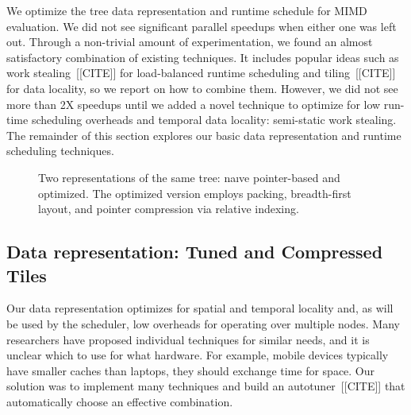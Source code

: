 We optimize the tree data representation and runtime schedule for MIMD evaluation. We did not see significant parallel speedups when either one was left out. Through a non-trivial amount of experimentation, we found an almost satisfactory combination of existing techniques. It includes popular ideas such as work stealing~[[CITE]] for load-balanced runtime scheduling and tiling~[[CITE]] for data locality, so we report on how to combine them. However, we did not see more than 2X speedups until we added a novel technique to optimize for low  run-time scheduling overheads and temporal data locality: semi-static work stealing. The remainder of this section explores our basic data representation and runtime scheduling techniques.


\begin{figure}
\centering
{} \linebreak
{}
\caption{Two representations of the same tree: na\i{v}e pointer-based and optimized. The optimized version employs packing, breadth-first layout, and pointer compression via relative indexing.}
\label{fig:compression}
\end{figure}


\subsection{Data representation: Tuned and Compressed Tiles}

Our data representation optimizes for spatial and temporal locality and, as will be used by the scheduler, low overheads for operating over multiple nodes. Many researchers have proposed individual techniques for similar needs, and it is unclear which to use for what hardware. For example, mobile devices typically have smaller caches than laptops, they should exchange time for space. Our solution was to implement many techniques and build an autotuner~[[CITE]] that automatically choose an effective combination.  

